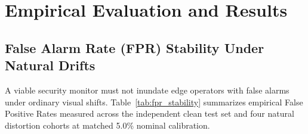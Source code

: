 \documentclass[preprint,12pt]{elsarticle}
\begin{document}
\section{Empirical Evaluation and Results}
\label{sec:results}

\subsection{False Alarm Rate (FPR) Stability Under Natural Drifts}
A viable security monitor must not inundate edge operators with false alarms under ordinary visual shifts. Table~\ref{tab:fpr_stability} summarizes empirical False Positive Rates measured across the independent clean test set and four natural distortion cohorts at matched 5.0\% nominal calibration.
\end{document}
